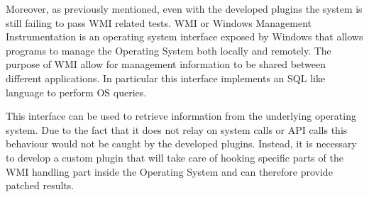 Moreover, as previously mentioned, even with the developed plugins the system is still failing to pass WMI related tests. WMI or Windows Management Instrumentation is an operating system interface exposed by Windows that allows programs to manage the Operating System both locally and remotely. The purpose of WMI allow for management information to be shared between different applications. In particular this interface implements an SQL like language to perform OS queries.

This interface can be used to retrieve information from the underlying operating system. Due to the fact that it does not relay on system calls or API calls this behaviour would not be caught by the developed plugins. Instead, it is necessary to develop a custom plugin that will take care of hooking specific parts of the WMI handling part inside the Operating System and can therefore provide patched results. 


